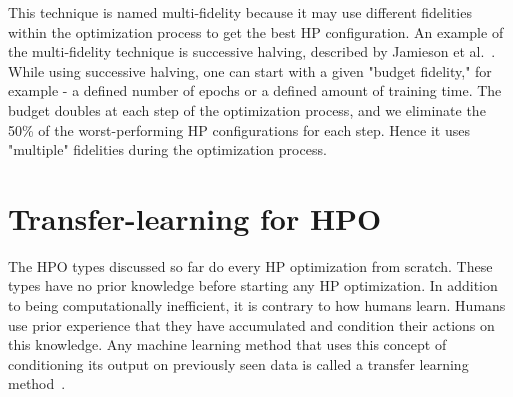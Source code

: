 \documentclass[12pt, twoside, ngerman]{report}
\begin{document}
This technique is named multi-fidelity because it may use different fidelities within the optimization process to get the best HP configuration.
An example of the multi-fidelity technique is successive halving, described by Jamieson et al.~\cite{successivehalving}. While using successive halving, one can start with a given "budget fidelity," for example - a defined number of epochs or a defined amount of training time.
The budget doubles at each step of the optimization process, and we eliminate the 50\% of the worst-performing HP configurations for each step.
Hence it uses "multiple" fidelities during the optimization process.


\section{Transfer-learning for HPO}

The HPO types discussed so far do every HP optimization from scratch. These types have no prior knowledge before starting any HP optimization.
In addition to being computationally inefficient,  it is contrary to how humans learn.
Humans use prior experience that they have accumulated and condition their actions on this knowledge.
Any machine learning method that uses this concept of conditioning its output on previously seen data is called a transfer learning method~\cite{Weiss2016}.
\end{document}
